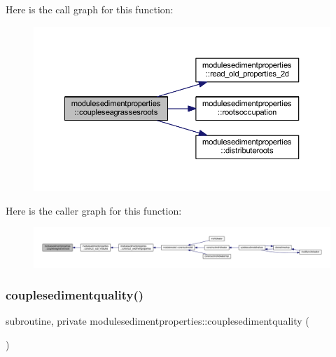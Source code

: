Here is the call graph for this function\+:\nopagebreak
\begin{figure}[H]
\begin{center}
\leavevmode
\includegraphics[width=350pt]{namespacemodulesedimentproperties_ab7687e8a644768320a332dacba7eb257_cgraph}
\end{center}
\end{figure}
Here is the caller graph for this function\+:\nopagebreak
\begin{figure}[H]
\begin{center}
\leavevmode
\includegraphics[width=350pt]{namespacemodulesedimentproperties_ab7687e8a644768320a332dacba7eb257_icgraph}
\end{center}
\end{figure}
\mbox{\label{namespacemodulesedimentproperties_ab1ad9fb8e7d7a22675312273d0b5abc5}} 
\subsubsection{\texorpdfstring{couplesedimentquality()}{couplesedimentquality()}}
{\footnotesize\ttfamily subroutine, private modulesedimentproperties\+::couplesedimentquality (\begin{DoxyParamCaption}{ }\end{DoxyParamCaption})\hspace{0.3cm}{\ttfamily [private]}}

